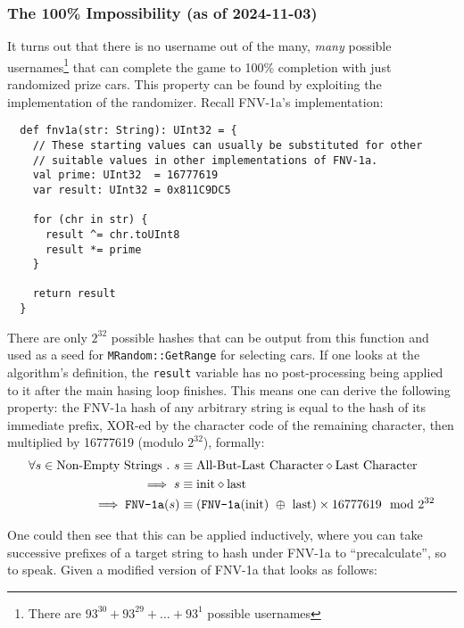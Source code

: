 \documentclass[14pt,a4paper,notitlepage]{extarticle}
\begin{document}
            \subsubsection*{The 100\% Impossibility (as of 2024-11-03)}
                It turns out that there is no username out of the many, \textit{many} possible
                usernames\footnote{There are $93^{30} + 93^{29} + \dots + 93^1$ possible usernames}
                that can complete the game to 100\% completion with just randomized prize
                cars. This property can be found by exploiting the implementation of the randomizer.
                Recall FNV-1a's implementation:

                \begin{lstlisting}
  def fnv1a(str: String): UInt32 = {
    // These starting values can usually be substituted for other
    // suitable values in other implementations of FNV-1a.
    val prime: UInt32  = 16777619
    var result: UInt32 = 0x811C9DC5

    for (chr in str) {
      result ^= chr.toUInt8
      result *= prime
    }

    return result
  }
                \end{lstlisting}

                There are only $2^{32}$ possible hashes that can be output from this function and
                used as a seed for \texttt{MRandom::GetRange} for selecting cars. If one
                looks at the algorithm's definition, the \texttt{result} variable has no
                post-processing being applied to it after the main hasing loop finishes.
                This means one can derive the following property: the FNV-1a hash of any arbitrary
                string is equal to the hash of its immediate prefix, XOR-ed by the character code
                of the remaining character, then multiplied by 16777619 (modulo $2^{32}$), formally:
                \begin{align*}
                    \forall s \in \text{Non-Empty Strings}\ .\ s &\equiv \text{All-But-Last Character} \diamond \text{Last Character}\\
                    \implies s &\equiv \text{init} \diamond \text{last}\\
                    \implies \text{\texttt{FNV-1a}}(s) &\equiv (\text{\texttt{FNV-1a}}(\text{init})\ \oplus\ \text{last}) \times 16777619 \mod 2^{32}
                \end{align*}

                One could then see that this can be applied inductively, where you can take successive
                prefixes of a target string to hash under FNV-1a to ``precalculate'', so to speak.
                Given a modified version of FNV-1a that looks as follows:
\end{document}
